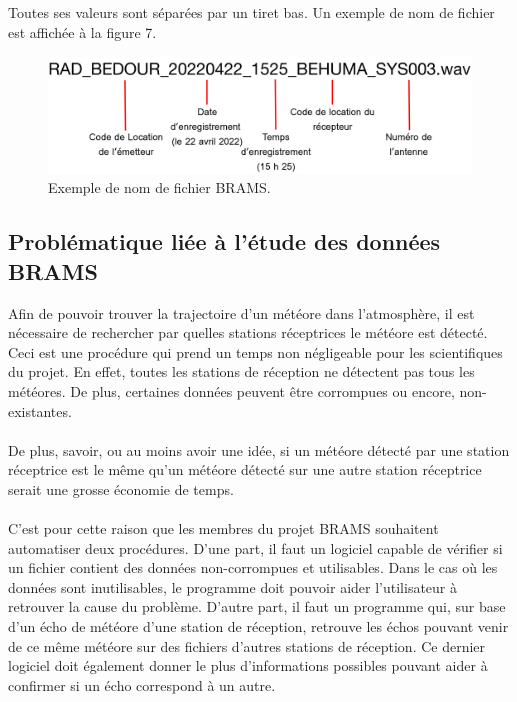 \documentclass[11pt]{article}
\begin{document}
Toutes ses valeurs sont séparées par un tiret bas.
Un exemple de nom de fichier est affichée à la figure 7.

\begin{figure}[t]
    \begin{center}
        \includegraphics[scale=0.15]{file_name.png}
        \caption{Exemple de nom de fichier BRAMS.}
    \end{center}
\end{figure}

\newpage

\subsection{Problématique liée à l'étude des données BRAMS}

Afin de pouvoir trouver la trajectoire d'un météore dans l'atmosphère, il est nécessaire de rechercher par quelles stations réceptrices le météore est détecté.
Ceci est une procédure qui prend un temps non négligeable pour les scientifiques du projet.
En effet, toutes les stations de réception ne détectent pas tous les météores.
De plus, certaines données peuvent être corrompues ou encore, non-existantes.\\
\\
De plus, savoir, ou au moins avoir une idée, si un météore détecté par une station réceptrice est le même qu'un météore détecté sur une autre station réceptrice serait une grosse économie de temps.\\
\\
C'est pour cette raison que les membres du projet BRAMS souhaitent automatiser deux procédures.
D'une part, il faut un logiciel capable de vérifier si un fichier contient des données non-corrompues et utilisables.
Dans le cas où les données sont inutilisables, le programme doit pouvoir aider l'utilisateur à retrouver la cause du problème.
D'autre part, il faut un programme qui, sur base d'un écho de météore d'une station de réception, retrouve les échos pouvant venir de ce même météore sur des fichiers d'autres stations de réception.
Ce dernier logiciel doit également donner le plus d'informations possibles pouvant aider à confirmer si un écho correspond à un autre.
\end{document}

